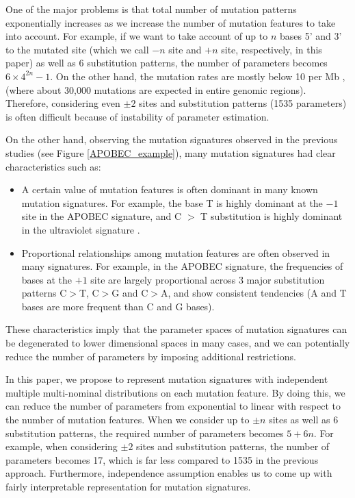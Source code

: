 One of the major problems is that 
total number of mutation patterns exponentially increases
as we increase the number of mutation features to take into account.
For example, if we want to take account of up to $n$ bases 5' and 3' to the mutated site 
(which we call $-n$ site and $+n$ site, respectively, in this paper) as well as 6 substitution patterns, 
the number of parameters becomes $6 \times 4^{2n} - 1$. 
On the other hand, the mutation rates are mostly below 10 per Mb \cite{pmid23945592},
(where about 30,000 mutations are expected in entire genomic regions).
Therefore, considering even $\pm 2$ sites and substitution patterns (1535 parameters)
is often difficult because of instability of parameter estimation. 


On the other hand, observing the mutation signatures observed in the previous studies (see Figure \ref{APOBEC_example}), 
many mutation signatures had clear characteristics such as:
\begin{itemize}
\item 
A certain value of mutation features is often dominant in many known mutation signatures. 
For example, the base T is highly dominant at the $-1$ site in the APOBEC signature, 
and C $>$ T substitution is highly dominant in the ultraviolet signature \cite{pmid23945592}. 

\item
Proportional relationships among mutation features are often observed in many signatures. 
For example, in the APOBEC signature, 
the frequencies of bases at the $+1$ site are largely proportional across 3 major substitution patterns C$>$T, C$>$G and C$>$A,
and show consistent tendencies (A and T bases are more frequent than C and G bases).

\end{itemize} 

These characteristics imply that the parameter spaces of mutation signatures can be degenerated to lower dimensional spaces in many cases, 
and we can potentially reduce the number of parameters by imposing additional restrictions. 

In this paper, we propose to represent mutation signatures with independent multiple multi-nominal distributions
on each mutation feature. 
By doing this, we can reduce the number of parameters from exponential to linear with respect to the number of mutation features. 
When we consider up to $\pm n$ sites as well as 6 substitution patterns, 
the required number of parameters becomes $5 + 6n$. 
For example, when considering $\pm 2$ sites and substitution patterns,
the number of parameters becomes 17, which is far less compared to 1535 in the previous approach.
Furthermore, independence assumption enables us to come up with fairly interpretable representation for mutation signatures.

